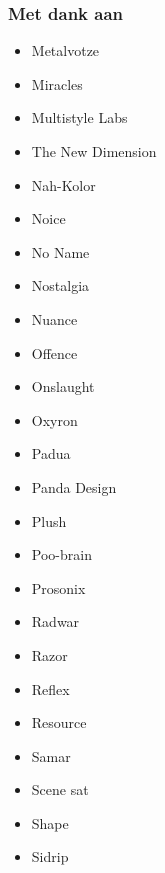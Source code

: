 
\begin{frame}
\frametitle{Met dank aan}

\begin{multicols}{3}
\begin{itemize}
\item Metalvotze
\item Miracles
\item Multistyle Labs
\item The New Dimension
\item Nah-Kolor
\item Noice
\item No Name
\item Nostalgia
\item Nuance
\item Offence
\item Onslaught
\item Oxyron
\item Padua
\item Panda Design
\item Plush
\item Poo-brain
\item Prosonix
\item Radwar
\item Razor
\item Reflex
\item Resource
\item Samar
\item Scene sat
\item Shape
\item Sidrip
\end{itemize}
\end{multicols}

\end{frame}


